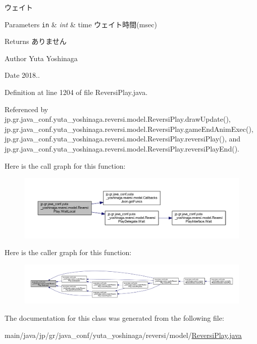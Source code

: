 ウェイト 


\begin{DoxyParams}[1]{Parameters}
\mbox{\tt in}  & {\em int} & time ウェイト時間(msec) \\
\hline
\end{DoxyParams}
\begin{DoxyReturn}{Returns}
ありません 
\end{DoxyReturn}
\begin{DoxyAuthor}{Author}
Yuta Yoshinaga 
\end{DoxyAuthor}
\begin{DoxyDate}{Date}
2018.. 
\end{DoxyDate}


Definition at line 1204 of file Reversi\+Play.\+java.



Referenced by jp.\+gr.\+java\+\_\+conf.\+yuta\+\_\+yoshinaga.\+reversi.\+model.\+Reversi\+Play.\+draw\+Update(), jp.\+gr.\+java\+\_\+conf.\+yuta\+\_\+yoshinaga.\+reversi.\+model.\+Reversi\+Play.\+game\+End\+Anim\+Exec(), jp.\+gr.\+java\+\_\+conf.\+yuta\+\_\+yoshinaga.\+reversi.\+model.\+Reversi\+Play.\+reversi\+Play(), and jp.\+gr.\+java\+\_\+conf.\+yuta\+\_\+yoshinaga.\+reversi.\+model.\+Reversi\+Play.\+reversi\+Play\+End().

Here is the call graph for this function\+:
\nopagebreak
\begin{figure}[H]
\begin{center}
\leavevmode
\includegraphics[width=350pt]{classjp_1_1gr_1_1java__conf_1_1yuta__yoshinaga_1_1reversi_1_1model_1_1_reversi_play_aec398cf0d2ac7bd1d1b64be67bcadde2_cgraph}
\end{center}
\end{figure}
Here is the caller graph for this function\+:
\nopagebreak
\begin{figure}[H]
\begin{center}
\leavevmode
\includegraphics[width=350pt]{classjp_1_1gr_1_1java__conf_1_1yuta__yoshinaga_1_1reversi_1_1model_1_1_reversi_play_aec398cf0d2ac7bd1d1b64be67bcadde2_icgraph}
\end{center}
\end{figure}


The documentation for this class was generated from the following file\+:\begin{DoxyCompactItemize}
\item 
main/java/jp/gr/java\+\_\+conf/yuta\+\_\+yoshinaga/reversi/model/\hyperlink{_reversi_play_8java}{Reversi\+Play.\+java}\end{DoxyCompactItemize}

